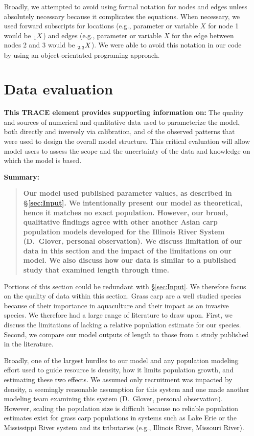 \documentclass{article}[12pt]
\begin{document}
Broadly, we attempted to avoid using formal notation for nodes and edges unless absolutely necessary because it complicates the equations.
When necessary, we used forward subscripts for locations (e.g., parameter or variable \(X\) for node 1 would be \(\prescript{}{1}{X}\)) and edges (e.g.,  parameter or variable \(X\) for the edge between nodes 2 and 3 would be \(\prescript{}{2,3}{X}\)).
We were able to avoid this notation in our code by using an object-orientated programing approach.

\stopcontents[sections]

\section{Data evaluation}\label{sec:dev}

\textbf{This TRACE element provides supporting information on:} The quality and sources of numerical and qualitative data used to parameterize the model, both directly and inversely via calibration, and of the observed patterns that were used to design the overall model structure. This critical evaluation will allow model users to assess the scope and the uncertainty of the data and knowledge on which the model is based.

\textbf{Summary:}
\begin{verse}
\textbf{
Our model used published parameter values, as described in \S \ref{sec:Input}.
We intentionally present our model as theoretical, hence it matches no exact population.
However, our broad, qualitative findings agree with other another Asian carp population models developed for the Illinois River System (D.~Glover, personal observation).
We discuss limitation of our data in this section and the impact of the limitations on our model.
We also discuss how our data is similar to a published study that examined length through time.
}
\end{verse}

Portions of this section could be redundant with \S \ref{sec:Input}.
We therefore focus on the quality of data within this section.
Grass carp are a well studied species because of their importance in aquaculture and their impact as an invasive species.
We therefore had a large range of literature to draw upon.
First, we discuss the limitations of lacking a relative population estimate for our species.
Second, we compare our model outputs of length to those from a study published in the literature.

Broadly, one of the largest hurdles to our model and any population modeling effort used to guide resource is density, how it limits population growth, and estimating these two effects.
We assumed only recruitment was impacted by density, a seemingly reasonable assumption for this system and one made another modeling team examining this system (D.~Glover, personal observation).
However, scaling the population size is difficult because no reliable population estimates exist for grass carp populations in systems such as Lake Erie or the Mississippi River system and its tributaries (e.g., Illinois River, Missouri River).  
\end{document}
